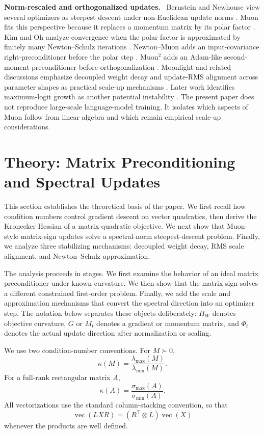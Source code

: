 \documentclass[sigconf,nonacm]{acmart}
\newcommand{\vpara}[1]{\par\noindent\textbf{#1.}\ }
\begin{document}
\vpara{Norm-rescaled and orthogonalized updates} Bernstein and Newhouse view several optimizers as steepest descent under non-Euclidean update norms \citep{bernstein2024oldoptimizer}. Muon fits this perspective because it replaces a momentum matrix by its polar factor \citep{kellerjordan2024muon}. Kim and Oh analyze convergence when the polar factor is approximated by finitely many Newton--Schulz iterations \citep{kim2026convergence}. Newton--Muon adds an input-covariance right-preconditioner before the polar step \citep{du2026newtonmuon}. Muon$^2$ adds an Adam-like second-moment preconditioner before orthogonalization \citep{liu2026muon2}. Moonlight and related discussions emphasize decoupled weight decay and update-RMS alignment across parameter shapes as practical scale-up mechanisms \citep{liu2025moonlight,su2025muonchoice}. Later work identifies maximum-logit growth as another potential instability \citep{su2025qkclip}. The present paper does not reproduce large-scale language-model training. It isolates which aspects of Muon follow from linear algebra and which remain empirical scale-up considerations.

\section{Theory: Matrix Preconditioning and Spectral Updates}
This section establishes the theoretical basis of the paper. We first recall how condition numbers control gradient descent on vector quadratics, then derive the Kronecker Hessian of a matrix quadratic objective. We next show that Muon-style matrix-sign updates solve a spectral-norm steepest-descent problem. Finally, we analyze three stabilizing mechanisms: decoupled weight decay, RMS scale alignment, and Newton--Schulz approximation.

The analysis proceeds in stages. We first examine the behavior of an ideal matrix preconditioner under known curvature. We then show that the matrix sign solves a different constrained first-order problem. Finally, we add the scale and approximation mechanisms that convert the spectral direction into an optimizer step. The notation below separates these objects deliberately: $H_W$ denotes objective curvature, $G$ or $M_t$ denotes a gradient or momentum matrix, and $\Phi_t$ denotes the actual update direction after normalization or scaling.

We use two condition-number conventions. For $M\succ0$,
\begin{equation}
  \kappa(M)=\frac{\lambda_{\max}(M)}{\lambda_{\min}(M)}.
\end{equation}
For a full-rank rectangular matrix $A$,
\begin{equation}
  \kappa(A)=\frac{\sigma_{\max}(A)}{\sigma_{\min}(A)}.
\end{equation}
All vectorizations use the standard column-stacking convention, so that
\begin{equation}
  \operatorname{vec}(LXR)=(R^\top\otimes L)\operatorname{vec}(X)
\end{equation}
whenever the products are well defined.
\end{document}
